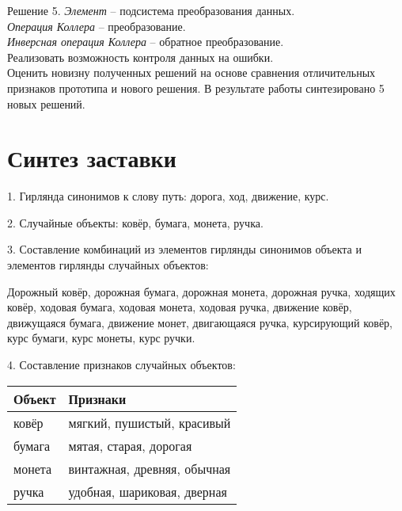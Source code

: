 Решение 5.
\emph{Элемент} -- подсистема преобразования данных.\\
\emph{Операция Коллера} -- преобразование.\\
\emph{Инверсная операция Коллера} -- обратное преобразование.\\
Реализовать возможность контроля данных на ошибки.\\

Оценить новизну полученных решений на основе сравнения отличительных признаков прототипа и нового решения. 
В результате работы синтезировано 5 новых решений.

\chapter{Синтез заставки}
1. Гирлянда синонимов к слову путь: дорога, ход, движение, курс.

2. Случайные объекты: ковёр, бумага, монета, ручка.

3. Составление комбинаций из элементов гирлянды синонимов объекта и элементов гирлянды случайных объектов:

Дорожный ковёр, дорожная бумага, дорожная монета, дорожная ручка, ходящих ковёр, ходовая бумага, 
ходовая монета, ходовая ручка, движение ковёр, движущаяся бумага, движение монет, двигающаяся ручка, 
курсирующий ковёр, курс бумаги, курс монеты, курс ручки.

4. Составление признаков случайных объектов:
\begin{table}[h!]
    \center
    \begin{tabularx}{\textwidth}{|X|X|}
        \hline
        Объект & Признаки \\ \hline
        ковёр & мягкий, пушистый, красивый \\ \hline
        бумага & мятая, старая, дорогая \\ \hline
        монета & винтажная, древняя, обычная \\ \hline
        ручка & удобная, шариковая, дверная \\ \hline
    \end{tabularx}
\end{table}

